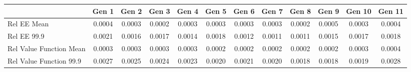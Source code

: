 
\begin{tabular}{@{}lccccccccccc@{}}
\hline
\hline
& Gen 1 & Gen 2 & Gen 3 & Gen 4 & Gen 5 & Gen 6 & Gen 7 & Gen 8 & Gen 9 & Gen 10 & Gen 11 \\
\hline
Rel EE Mean          & 0.0004 & 0.0003 & 0.0002 & 0.0003 & 0.0003 & 0.0003 & 0.0003 & 0.0002 & 0.0005 & 0.0003 & 0.0004 \\
Rel EE 99.9     & 0.0021 & 0.0016 & 0.0017 & 0.0014 & 0.0018 & 0.0012 & 0.0011 & 0.0011 & 0.0015 & 0.0017 & 0.0018 \\
Rel Value Function Mean       & 0.0003 & 0.0003 & 0.0003 & 0.0003 & 0.0002 & 0.0002 & 0.0002 & 0.0002 & 0.0002 & 0.0003 & 0.0004 \\
Rel Value Function 99.9  & 0.0027 & 0.0025 & 0.0024 & 0.0023 & 0.0020 & 0.0021 & 0.0020 & 0.0018 & 0.0018 & 0.0019 & 0.0028 \\
\bottomrule
\end{tabular}